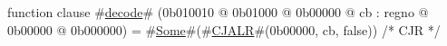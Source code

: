 function clause #\hyperref[zdecode]{decode}# (0b010010 @ 0b01000 @ 0b00000    @ cb : regno @ 0b00000 @ 0b000000) = #\hyperref[zSome]{Some}#(#\hyperref[zCJALR]{CJALR}#(0b00000, cb, false)) /* CJR */
